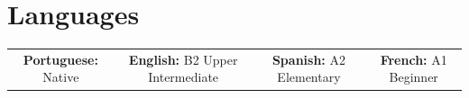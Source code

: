 \documentclass[letterpaper,11pt]{article}
\begin{document}
\section{\faComments \hspace{0.2cm} \Large Languages}

\begin{tabular}{c c c c}
    \textbf{Portuguese:} Native & \hspace{0.5cm}
    \textbf{English:} B2 Upper Intermediate & \hspace{0.5cm}
    \textbf{Spanish:} A2 Elementary & \hspace{0.5cm}
    \textbf{French:} A1 Beginner
\end{tabular}
\end{document}
